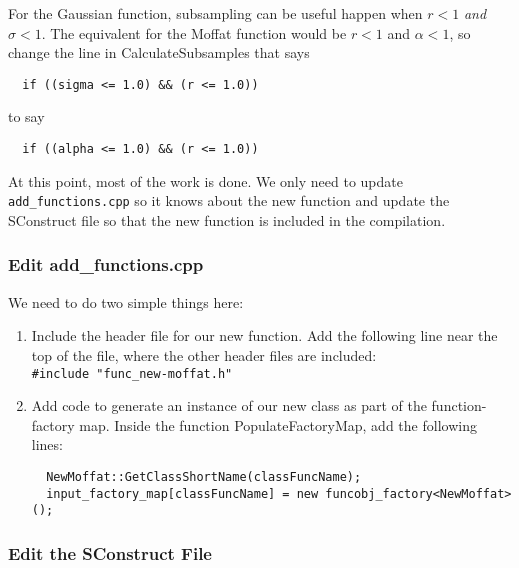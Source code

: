 \documentclass[10pt,a4paper,article]{memoir}
\begin{document}
For the Gaussian function, subsampling can be useful
happen when $r < 1$ \textit{and} $\sigma < 1$. The equivalent
for the Moffat function would be $r < 1$ and $\alpha < 1$, so
change the line in CalculateSubsamples that says
\begin{verbatim}
  if ((sigma <= 1.0) && (r <= 1.0))
\end{verbatim}
to say
\begin{verbatim}
  if ((alpha <= 1.0) && (r <= 1.0))
\end{verbatim}


\bigskip


At this point, most of the work is done.  We only need to update
\texttt{add\_functions.cpp} so it knows about the new function and
update the SConstruct file so that the new function is included in the
compilation.


\subsubsection{Edit add\_functions.cpp}

We need to do two simple things here:
\begin{enumerate}
\item Include the header file for our new function. Add the following line near
the top of the file, where the other header files are included:\\
\texttt{\#include "func\_new-moffat.h"}

\item Add code to generate an instance of our new class as part of the
function-factory map. Inside the function PopulateFactoryMap, add the following lines:
\begin{verbatim}
  NewMoffat::GetClassShortName(classFuncName);
  input_factory_map[classFuncName] = new funcobj_factory<NewMoffat>();
\end{verbatim}

\end{enumerate}



\subsubsection{Edit the SConstruct File}
\end{document}
